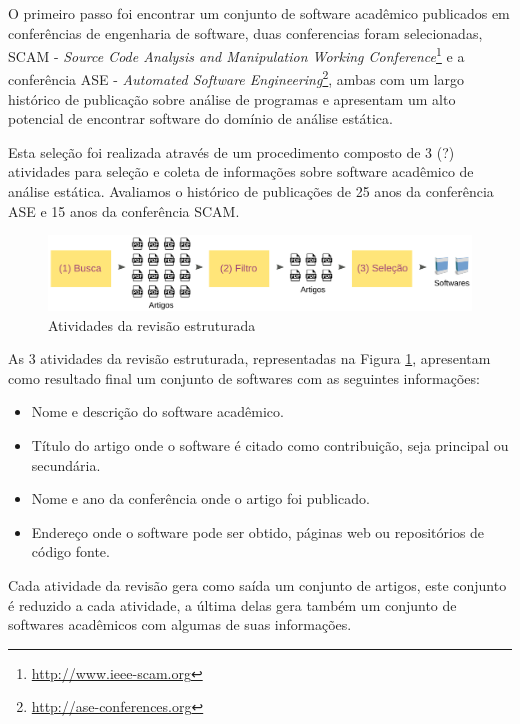 O primeiro passo foi encontrar um conjunto de software acadêmico publicados em
conferências de engenharia de software, duas conferencias foram selecionadas,
SCAM - {\it Source Code Analysis and Manipulation Working
Conference}\footnote{\url{http://www.ieee-scam.org}} e a conferência ASE - {\it
Automated Software Engineering}\footnote{\url{http://ase-conferences.org}},
ambas com um largo histórico de publicação sobre análise de programas e
apresentam um alto potencial de encontrar software do domínio de análise
estática.


Esta seleção foi realizada através de um procedimento composto de 3 (?)
atividades para seleção e coleta de informações sobre software acadêmico de
análise estática. Avaliamos o histórico de publicações de 25 anos da
conferência ASE e 15 anos da conferência SCAM.

\begin{figure}[h]
  \center
  \includegraphics[scale=0.21]{imagens/revisao-estruturada.png}
  \caption{Atividades da revisão estruturada}
  \label{figura-revisao-estruturada}
\end{figure}

As 3 atividades da revisão estruturada, representadas na Figura
\ref{figura-revisao-estruturada}, apresentam como resultado final um conjunto
de softwares com as seguintes informações:

\begin{itemize}
  \item Nome e descrição do software acadêmico.
  \item Título do artigo onde o software é citado como contribuição, seja principal ou secundária.
  \item Nome e ano da conferência onde o artigo foi publicado.
  \item Endereço onde o software pode ser obtido, páginas web ou repositórios de código fonte.
\end{itemize}

Cada atividade da revisão gera como saída um conjunto de artigos, este conjunto
é reduzido a cada atividade, a última delas gera também um conjunto de
softwares acadêmicos com algumas de suas informações.

